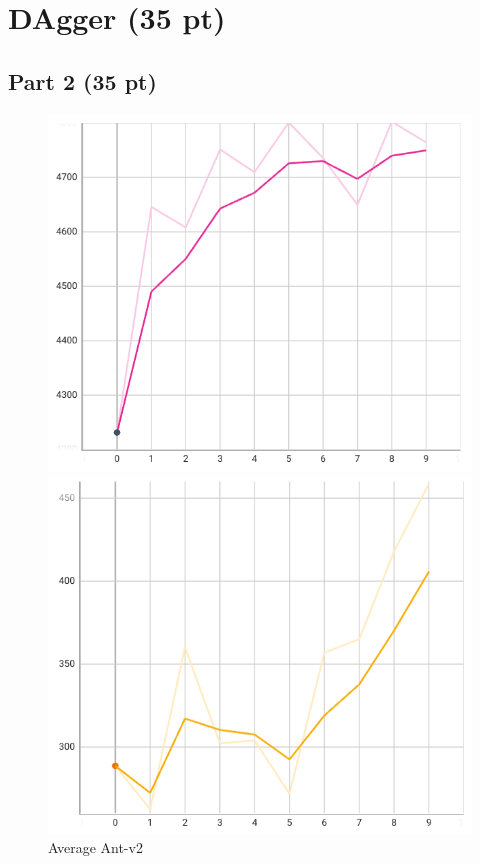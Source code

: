 \documentclass{article}
\begin{document}
\section{DAgger (35 pt)}
\subsection{Part 2 (35 pt)}
\begin{figure}[!h]
        \centering
        \begin{minipage}[b]{0.45\textwidth}
            \centering
            \includegraphics[width=0.9\linewidth]{hw1/avg_ant.png}
            \caption{Average Ant-v2}
            \label{fig:sub1}
        \end{minipage}
        \hfill
        \begin{minipage}[b]{0.45\textwidth}
            \centering
            \includegraphics[width=0.9\linewidth]{hw1/avg_humanoid.png}

\end{minipage}
\end{figure}
\end{document}
